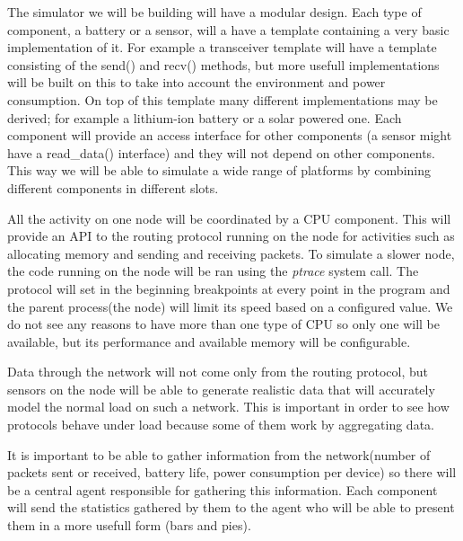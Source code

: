 \label{subsec:architecture}

The simulator we will be building will have a modular design. Each type
of component, a battery or a sensor, will a have a template containing a
very basic implementation of it. For example a transceiver template will
have a template consisting of the send() and recv() methods, but more
usefull implementations will be built on this to take into account the
environment and power consumption. On top of this template many different
implementations may be derived; for example a lithium-ion battery or a solar
powered one. Each component will provide an access interface for other components
(a sensor might have a read_data() interface) and they will not depend on other 
components. This way we will be able to simulate a wide range of platforms by
combining different components in different slots.

All the activity on one node will be coordinated by a CPU component. This will provide
an API to the routing protocol running on the node for activities such as allocating memory 
and sending and receiving packets. To simulate a slower node, the code running on the 
node will be ran using the \textit{ptrace} system call. The protocol will set in the beginning
breakpoints at every point in the program and the parent process(the node) will limit
its speed based on a configured value. We do not see any reasons to have more than one
type of CPU so only one will be available, but its performance and available memory
will be configurable.

Data through the network will not come only from the routing protocol, but sensors on the 
node will be able to generate realistic data that will accurately model the normal load
on such a network. This is important in order to see how protocols behave under load 
because some of them work by aggregating data.

It is important to be able to gather information from the network(number of packets sent
or received, battery life, power consumption per device) so there will be a central agent
responsible for gathering this information. Each component will send the statistics gathered
by them to the agent who will be able to present them in a more usefull form (bars and pies).
